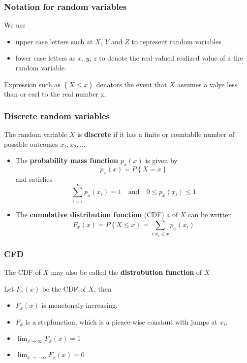 \documentclass{article}
\theoremstyle{remark}
\begin{document}
\subsubsection{Notation for random variables}%
\label{ssub:notation_for_random_variables}

We use 
\begin{itemize}
  \item upper case letters such at $X$, $Y$ and $Z$  to represent random variables.
  \item lower case letters as $x$, $y$, $z$ to denote the real-valued realized value of a the random variable.
\end{itemize}

Expression such as $\left\{ X \le x \right\}$ denators the event that $X$ assumes a valye less than or earl to the real number x.

\subsubsection{Discrete random variables}%
\label{ssub:discrete_random_variables}

The random variable $X$ is \textbf{discrete}  if it has a finite or countablle number of possible outcomes $x_{1}, x_{2}, \ldots$ \par
\begin{itemize}
  \item The \textbf{probability mass function } $p_{x} \left( x \right) $ is given by \[
  p_{x}\left( x \right) = P \left\{ X = x \right\}
  \] and satisfies \[
  \sum_{i=1}^{\infty} p_{x}\left( x_{i} \right) = 1 \quad  \text{and} \quad  0\le p_{x} \left( x_{i} \right) \le  1 
  \] 
\item The \textbf{cumulative distribution function} (CDF) a of $X$ can be written \[
F_{x}\left( x \right) = P\left\{ X \le x \right\} = \sum_{i: x_{i} \le x}^{} p_{x}\left( x_{i} \right) 
\]  
\end{itemize}

\subsubsection{CFD}%
\label{ssub:cfd} 

The CDF of $X$ may also be called the \textbf{distrobution function}  of $X$ \par 
Let $F_{x}\left( x \right)$ be the CDF of $X$, then 
\begin{itemize}
  \item $F_{x}\left( x \right)$ is monetonaly increasing.
  \item $F_{x}$ is a stepfunction, which is a pieace-wise constant with jumps at $x_{i}.$
  \item $\lim_{x \to \infty} F_{x}\left( x \right) = 1$
  \item $\lim_{x \to - \infty} F_{x}\left( x \right) = 0$
\end{itemize}
\end{document}
